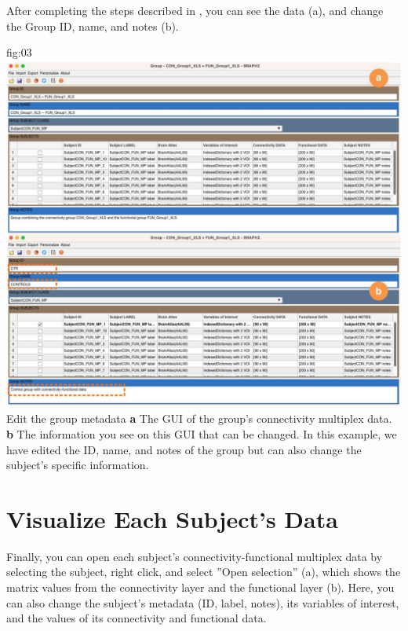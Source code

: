 \documentclass[justified]{tufte-handout}
\begin{document}
After completing the steps described in , you can see the data (a), and change the Group ID, name, and notes (b). 

	{fig:03}
	{
	\includegraphics{fig03.jpg}
	}
	{Edit the group metadata}
	{ 
	{\bf a} The GUI of the group's connectivity multiplex data. 
	{\bf b} The information you see on this GUI that can be changed. In this example, we have edited the ID, name, and notes of the group but can also change the subject's specific information.
	}

\section{Visualize Each Subject's Data}

Finally, you can open each subject's connectivity-functional multiplex data by selecting the subject, right click, and select ''Open selection'' (a), which shows the matrix values from the connectivity layer and the functional layer (b). Here, you can also change the subject's metadata (ID, label, notes), its variables of interest, and the values of its connectivity and functional data.
\end{document}
